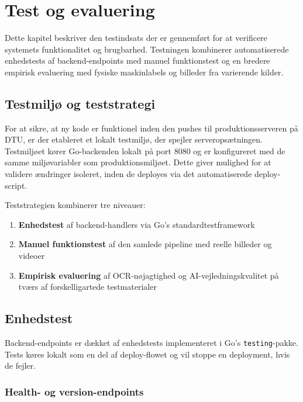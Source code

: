 \chapter{Test og evaluering}
\label{chap:testing}

Dette kapitel beskriver den testindsats der er gennemført for at verificere systemets funktionalitet og brugbarhed. Testningen kombinerer automatiserede enhedstests af backend-endpoints med manuel funktionstest og en bredere empirisk evaluering med fysiske maskinlabels og billeder fra varierende kilder.

\section{Testmiljø og teststrategi}
\label{sec:testmiljø}

For at sikre, at ny kode er funktionel inden den pushes til produktionsserveren på DTU, er der etableret et lokalt testmiljø, der spejler serveropsætningen. Testmiljøet kører Go-backenden lokalt på port 8080 og er konfigureret med de samme miljøvariabler som produktionsmiljøet. Dette giver mulighed for at validere ændringer isoleret, inden de deployes via det automatiserede deploy-script.

Teststrategien kombinerer tre niveauer:

\begin{enumerate}
  \item \textbf{Enhedstest} af backend-handlers via Go's standardtestframework
  \item \textbf{Manuel funktionstest} af den samlede pipeline med reelle billeder og videoer
  \item \textbf{Empirisk evaluering} af OCR-nøjagtighed og AI-vejledningskvalitet på tværs af forskelligartede testmaterialer
\end{enumerate}

\section{Enhedstest}
\label{sec:enhedstest}

Backend-endpoints er dækket af enhedstests implementeret i Go's \texttt{testing}-pakke. Tests køres lokalt som en del af deploy-flowet og vil stoppe en deployment, hvis de fejler.

\subsection{Health- og version-endpoints}
\label{subsec:health-test}

